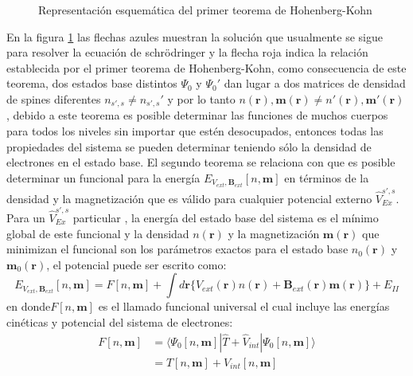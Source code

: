 \documentclass[12pt,a4paper, oneside]{book}
\begin{document}
  \begin{figure}[!hbt]
  	\centering
  	\caption{Representaci\'on esquem\'atica del primer teorema de Hohenberg-Kohn}
  	\label{fig:hk1}
  \end{figure}
\newline
  En la figura \ref{fig:hk1} las flechas azules muestran la soluci\'on que usualmente se sigue para resolver la ecuaci\'on de schr\"odringer y la flecha roja indica la relaci\'on establecida por el primer teorema de Hohenberg-Kohn,  como consecuencia de este teorema, dos estados base distintos $\Psi_0 $ y $\Psi_0 '$ dan lugar a dos matrices de densidad de spines diferentes $n_{s',s} \not =n_{s',s}' $ y por lo tanto $n(\pmb{r}), \pmb{m}(\pmb{r}) \not = n'(\pmb{r}), \pmb{m}'(\pmb{r})$, debido a este teorema es posible determinar las funciones de muchos cuerpos para todos los niveles sin importar que est\'en desocupados, entonces todas las propiedades del sistema se pueden determinar teniendo s\'olo la densidad de electrones en el estado base.
  \newline
  El segundo teorema se relaciona con que es posible determinar un funcional para la energ\'ia $E_{V_{ext}, \pmb{B}_{ext}}[n,\pmb{m}]$ en t\'erminos de la densidad y la magnetizaci\'on que es v\'alido para cualquier potencial externo $\hat{V}_{Ex}^{s', s}$. Para un $\hat{V}_{Ex}^{s', s}$ particular , la energ\'ia del estado base del sistema es el m\'inimo global de este funcional y la densidad $n(\pmb{r})$ y la magnetizaci\'on $\pmb{m}(\pmb{r})$ que minimizan el funcional son los par\'ametros exactos para el estado base  $n_0(\pmb{r})$ y $\pmb{m}_0(\pmb{r})$, el potencial puede ser escrito como:
  \begin{equation}
   E_{V_{ext}, \pmb{B}_{ext}}[n,\pmb{m}]= F[n,\pmb{m}] + \int d \pmb{r} \{V_{ext} (\pmb{r}) n(\pmb{r})+\pmb{B}_{ext} (\pmb{r}) \pmb{m} (\pmb{r}) \} +E_{II} \label{ec:funcional}
  \end{equation}
  en donde$F[n,\pmb{m}]$ es el llamado funcional universal el cual incluye las energ\'ias cin\'eticas y potencial del sistema de electrones:
  \begin{eqnarray}
  F[n,\pmb{m}]&= \langle \Psi_0 [n,\pmb{m}]| \hat{T}+\hat{V}_{int} | \Psi_0 [n,\pmb{m}] \rangle \nonumber \\
              &= T[n,\pmb{m}] + V_{int} [n,\pmb{m}] \label{ec:funcF}
  \end{eqnarray}
  
\end{document}
